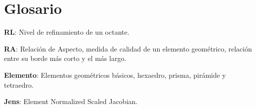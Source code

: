 \section{\textbf{Glosario}}

{\setlength{\parskip}{0cm} %


\textbf{RL}: Nivel de refinamiento de un octante.

\textbf{RA}: Relación de Aspecto, medida de calidad de un elemento geométrico, relación entre su borde más corto y el más largo.
}
\textbf{Elemento}: Elementos geométricos básicos, hexaedro, prisma, pirámide y tetraedro.

\textbf{Jens}: Element Normalized Scaled Jacobian.